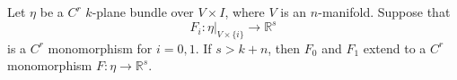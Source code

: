 Let $\eta$ be a $C^r$ $k$-plane bundle over $V \times I$, where $V$ is an $n$-manifold. Suppose that
$$F_i: \eta|_{V \times \{i\}} \to \mathbb{R}^s$$
is a $C^r$ monomorphism for $i = 0, 1$. If $s > k + n$, then $F_0$ and $F_1$ extend to a $C^r$ monomorphism $F: \eta \to \mathbb{R}^s$.
